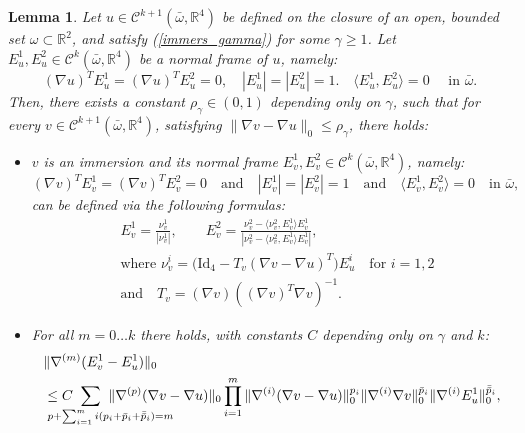 \documentclass[reqno,twoside,11pt]{amsart}
\newcommand{\Id}{\mathrm{Id}}
\newcommand{\R}{\mathbb{R}}
\newcommand*{\dbar}[1]{\bar{\bar{#1}}}
\numberwithin{equation}{section}
\theoremstyle{plain}
\newtheorem{lemma}[theorem]{Lemma}
\theoremstyle{definition}
\begin{document}
\begin{lemma}\label{lem_propa}
Let $u\in\mathcal{C}^{k+1}(\bar\omega, \R^4)$ be defined on the closure of an
open, bounded set $\omega\subset\R^2$, and satisfy (\ref{immers_gamma}) for
some $\gamma\ge 1$. Let $E_u^1, E_u^2\in\mathcal{C}^{k}(\bar\omega, \R^4)$
be a normal frame of $u$, namely:
\begin{equation}\label{norm_frame}
(\nabla u)^T E_u^1 = (\nabla u)^T E_u^2 = 0,\quad |E^1_u|=|E^2_u|=1.
\quad \langle E^1_u, E^2_u\rangle = 0 \quad\mbox{ in } \bar\omega.
\end{equation}
Then, there exists a constant $\rho_\gamma\in (0,1)$ depending only on $\gamma$, such that
for every $v\in\mathcal{C}^{k+1}(\bar\omega, \R^4)$, satisfying
$\|\nabla v-\nabla u\|_0\leq \rho_\gamma$, there holds:
\begin{itemize}
\item[(i)] $v$ is an immersion and its normal frame $E_v^1,
  E_v^2\in\mathcal{C}^{k}(\bar\omega, \R^4)$, namely: 
$$(\nabla v)^T E_v^1 = (\nabla v)^T E_v^2 = 0 \quad \mbox{and}\quad
|E^1_v|=|E^2_v|=1 \quad\mbox{and} \quad \langle E^1_v, E^2_v\rangle =
0\quad \mbox{in } \bar\omega,$$ 
can be defined via the following formulas:
\begin{equation}\label{propa_def} 
\begin{split}
& E^1_v = \frac{\nu^1_v}{|\nu^1_v|}, \qquad 
E^2_v = \frac{\nu^2_v - \langle \nu_v^2, E^1_v\rangle E^1_v}{|\nu^2_v -
  \langle \nu_v^2, E^1_v\rangle E^1_v|},\\
& \mbox{where } \nu_v^i= \big(\Id_4 - T_v(\nabla v - \nabla u)^T\big)E^i_u
\quad\mbox{for } i=1,2 \\ & \mbox{and} \quad T_v= (\nabla v)((\nabla v)^T\nabla v)^{-1}.
\end{split}
\end{equation}
\item[(ii)] For all $m=0\ldots k$ there holds, with constants $C$ depending only on $\gamma$ and $k$:
\begin{equation*}
\begin{split}    
& \|\nabla^{(m)}(E^1_v-E^1_u)\|_0\\ & \leq C
\hspace{-7mm}\sum_{ p+\sum_{i=1}^mi(p_i+\bar
  p_i + \dbar p_i)=m\hspace{-10mm}} \hspace{-7mm} \|\nabla^{(p)}(\nabla v-\nabla u)\|_0
\prod_{i=1}^m \|\nabla^{(i)}(\nabla v - \nabla u)\|_0^{p_i} \|\nabla^{(i)}\nabla v\|_0^{\bar p_i}
\|\nabla^{(i)}E^1_u\|_0^{\dbar p_i},\\

\end{split}
\end{equation*}
\end{itemize}
\end{lemma}
\end{document}

